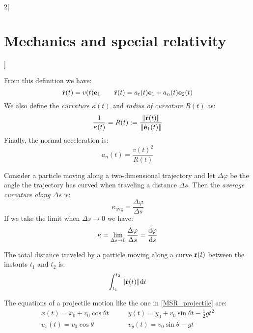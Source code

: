 \documentclass[../../../main.tex]{subfiles}
\begin{document}
\begin{multicols}{2}[\section{Mechanics and special relativity}]
\begin{definition}
    From this definition we have: $$\dot{\boldsymbol{\mathrm{r}}}(t)=v(t)\boldsymbol{\mathrm{e}}_1\qquad\ddot{\boldsymbol{\mathrm{r}}}(t)=a_t(t)\boldsymbol{\mathrm{e}}_1+a_n(t)\boldsymbol{\mathrm{e}}_2(t)$$ We also define the \textit{curvature $\kappa(t)$} and \textit{radius of curvature $R(t)$} as: $$\frac{1}{\kappa(t)}=R(t):=\frac{\|\dot{\boldsymbol{\mathrm{r}}}(t)\|}{\|\dot{\boldsymbol{\mathrm{e}}}_1(t)\|}$$ Finally, the normal acceleration is: $$a_n(t)=\frac{v(t)^2}{R(t)}$$
  \end{definition}
  \begin{prop}[Curvature]
    Consider a particle moving along a two-dimensional trajectory and let $\Delta\varphi$ be the angle the trajectory has curved when traveling a distance $\Delta s$. Then the \textit{average curvature along $\Delta s$} is: $$\kappa_\text{avg}=\frac{\Delta \varphi}{\Delta s}$$ If we take the limit when $\Delta s\to 0$ we have: $$\kappa=\lim_{\Delta s\to 0}\frac{\Delta \varphi}{\Delta s}=\dv{\varphi}{s}$$
  \end{prop}
  \begin{prop}
    The total distance traveled by a particle moving along a curve $\boldsymbol{\mathrm{r}}(t)$ between the instants $t_1$ and $t_2$ is: $$\int_{t_1}^{t_2}\|\dot{\boldsymbol{\mathrm{r}}}(t)\|\dd t$$
  \end{prop}
  \begin{prop}
    The equations of a projectile motion like the one in \cref{MSR_projectile} are:
    \begin{align*}
      x(t)=x_0+v_0\cos\theta t\quad & \quad y(t)=y_0+v_0\sin\theta t-\frac{1}{2}gt^2 \\
      v_x(t)=v_0\cos\theta\quad     & \quad v_y(t)=v_0\sin\theta-gt
    \end{align*}
    \begin{center}
      \begin{minipage}{\linewidth}
        \centering
        
        \label{MSR_projectile}
      \end{minipage}
    \end{center}
  \end{prop}

\end{multicols}
\end{document}
